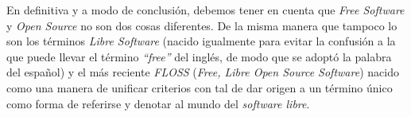 En definitiva y a modo de conclusión, debemos tener en cuenta que \textit{Free
Software} y \textit{Open Source} no son dos cosas diferentes. De la misma manera
que tampoco lo son los términos \textit{Libre Software} (nacido igualmente para
evitar la confusión a la que puede llevar el término \textit{``free''} del
inglés, de modo que se adoptó la palabra del español) y el más reciente
\textit{FLOSS} (\textit{Free, Libre Open Source Software}) nacido como una
manera de unificar criterios con tal de dar origen a un término único como
forma de referirse y denotar al mundo del \textit{software libre}.

